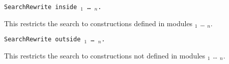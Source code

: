 \begin{Variants}
\item {\tt SearchRewrite {\term} inside
{\module$_1$} \ldots{} {\module$_n$}.}

This restricts the search to constructions defined in modules
{\module$_1$} \ldots{} {\module$_n$}.

\item {\tt SearchRewrite {\term} outside {\module$_1$} \ldots{} {\module$_n$}.}

This restricts the search to constructions not defined in modules
{\module$_1$} \ldots{} {\module$_n$}.

\end{Variants}




